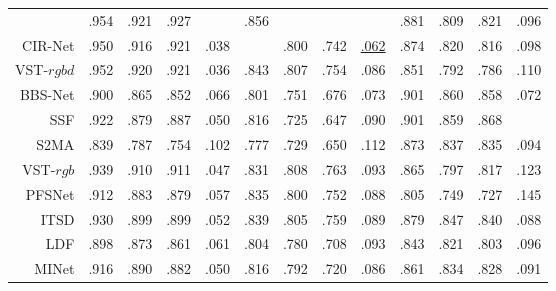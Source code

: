 \begin{table}[p]
{\begin{tabular}{rcccccccccccc}
			& .954 & .921 & .927 & \dashuline{.031}
			& .856 & \dashuline{.812} & \dashuline{.768} & \dashuline{.065}
			& .881 & .809 & .821 & .096 \\
			
			CIR-Net \upcite{cong2022cir}
			& .950 & .916 & .921 & .038 
			& \dashuline{.862} & .800 & .742 & \underline{.062}
			& .874 & .820 & .816 & .098 \\ 
			
			VST-$rgbd$  \upcite{liu2021visual} 
			& .952 & .920 & .921 & .036 
			& .843 & .807 & .754 & .086 
			& .851 & .792 & .786 & .110 
			\\
			
			
			BBS-Net     \upcite{fan2020bbs} 
			& .900 & .865 & .852 & .066 
			& .801 & .751 & .676 & .073 
			& .901 & .860 & .858 & .072 \\ 
			
			SSF     \upcite{zhang2020select} 
			& .922 & .879 & .887 & .050 
			& .816 & .725 & .647 & .090 
			& .901 & .859 & .868 & \dashuline{.067} \\ 
			
			S2MA    \upcite{liu2020learning} 
			& .839 & .787 & .754 & 	.102 
			& .777 & .729 & .650 & .112 
			& .873 & .837 &	.835 & .094 \\
			
			
			
			VST-$rgb$ \upcite{liu2021visual} 
			& .939 & .910 & .911 & .047
			& .831 & .808 & .763 & .093 
			& .865 & .797 & .817 & .123 
			\\ 
			
			PFSNet \upcite{ma2021pyramidal}
			& .912 & .883 & .879 & .057 
			& .835 & .800 & .752 & .088 
			& .805 & .749 & .727 & .145 
			\\ 
			
			
			ITSD \upcite{zhou2020interactive} 
			& .930 & .899 & .899 & .052 
			& .839 & .805 & .759 & .089 
			& .879 & .847 & .840 & .088 
			\\ 
			
			
			
			LDF \upcite{wei2020label} 
			& .898 & .873 & .861 & .061 
			& .804 & .780 & .708 & .093 
			& .843 & .821 & .803 & .096 
			\\ 
			
			
			MINet \upcite{pang2020multi} 
			& .916 & .890 & .882 & .050 
			& .816 & .792 & .720 & .086 
			& .861 & .834 & .828 & .091 
			\\ 
			

\end{tabular}}
\end{table}
